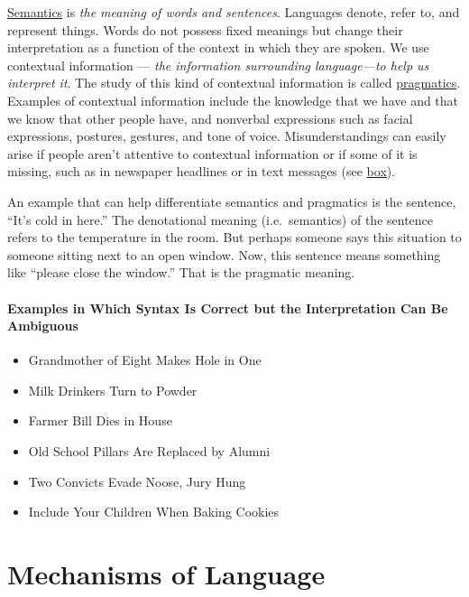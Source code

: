 \documentclass[
]{krantz}
\providecommand{\tightlist}{%
  \setlength{\itemsep}{0pt}\setlength{\parskip}{0pt}}
\begin{document}
\hyperref[semantics]{Semantics} is \emph{the meaning of words and sentences}. Languages denote, refer to, and represent things. Words do not possess fixed meanings but change their interpretation as a function of the context in which they are spoken. We use contextual information --- \emph{the information surrounding language---to help us interpret it}. The study of this kind of contextual information is called \hyperref[pragmatics]{pragmatics}. Examples of contextual information include the knowledge that we have and that we know that other people have, and nonverbal expressions such as facial expressions, postures, gestures, and tone of voice. Misunderstandings can easily arise if people aren't attentive to contextual information or if some of it is missing, such as in newspaper headlines or in text messages (see \hyperref[examples-in-which-syntax-is-correct-but-the-interpretation-can-be-ambiguous]{box}).

An example that can help differentiate semantics and pragmatics is the sentence, ``It's cold in here.'' The denotational meaning (i.e.~semantics) of the sentence refers to the temperature in the room. But perhaps someone says this situation to someone sitting next to an open window. Now, this sentence means something like ``please close the window.'' That is the pragmatic meaning.

\paragraph*{Examples in Which Syntax Is Correct but the Interpretation Can Be Ambiguous}\label{examples-in-which-syntax-is-correct-but-the-interpretation-can-be-ambiguous}

\begin{itemize}
\tightlist
\item
  Grandmother of Eight Makes Hole in One
\item
  Milk Drinkers Turn to Powder
\item
  Farmer Bill Dies in House
\item
  Old School Pillars Are Replaced by Alumni
\item
  Two Convicts Evade Noose, Jury Hung
\item
  Include Your Children When Baking Cookies
\end{itemize}

\section{Mechanisms of Language}\label{mechanisms-of-language}
\end{document}
